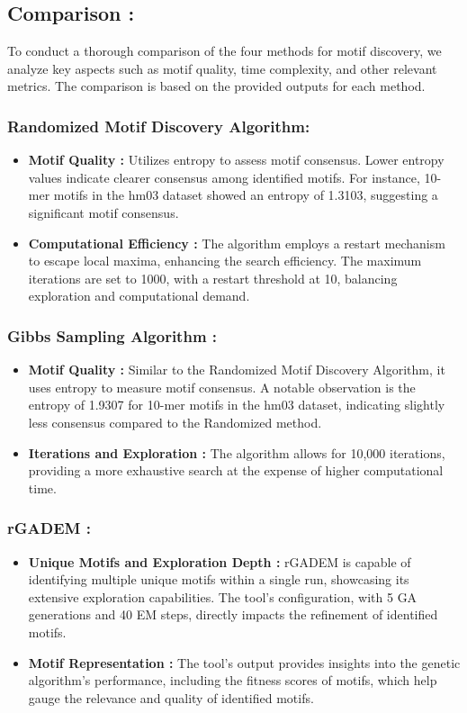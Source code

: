 \subsection{Comparison :} 
To conduct a thorough comparison of the four methods for motif discovery, we analyze key aspects such as motif quality, time complexity, and other relevant metrics. The comparison is based on the provided outputs for each method.

\subsubsection{Randomized Motif Discovery Algorithm:}
\begin{itemize}
    \item \textbf{Motif Quality : }Utilizes entropy to assess motif consensus. Lower entropy values indicate clearer consensus among identified motifs. For instance, 10-mer motifs in the hm03 dataset showed an entropy of 1.3103, suggesting a significant motif consensus.
   \item \textbf{Computational Efficiency : }The algorithm employs a restart mechanism to escape local maxima, enhancing the search efficiency. The maximum iterations are set to 1000, with a restart threshold at 10, balancing exploration and computational demand.
\end{itemize}

\subsubsection{Gibbs Sampling Algorithm : }
\begin{itemize}
    \item \textbf{Motif Quality : }Similar to the Randomized Motif Discovery Algorithm, it uses entropy to measure motif consensus. A notable observation is the entropy of 1.9307 for 10-mer motifs in the hm03 dataset, indicating slightly less consensus compared to the Randomized method.
     \item \textbf{Iterations and Exploration : }The algorithm allows for 10,000 iterations, providing a more exhaustive search at the expense of higher computational time.
\end{itemize}

\subsubsection{rGADEM : }
\begin{itemize}
\item \textbf{Unique Motifs and Exploration Depth : }rGADEM is capable of identifying multiple unique motifs within a single run, showcasing its extensive exploration capabilities. The tool's configuration, with 5 GA generations and 40 EM steps, directly impacts the refinement of identified motifs.
\item \textbf{Motif Representation : }The tool's output provides insights into the genetic algorithm's performance, including the fitness scores of motifs, which help gauge the relevance and quality of identified motifs.
\end{itemize}


